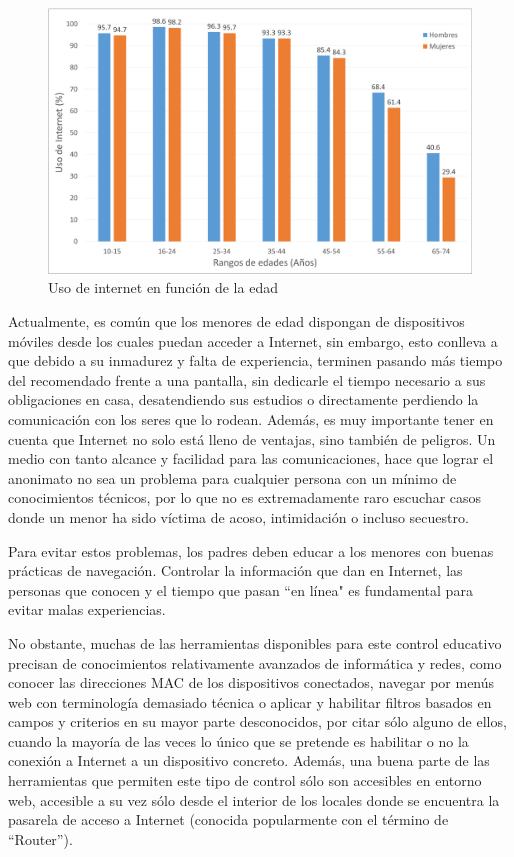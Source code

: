 \documentclass[12pt, twoside]{article}
\begin{document}
\begin{figure}[h!]
    \centering
        \includegraphics[scale=0.5]{internet_ages.eps}
        \caption{Uso de internet en función de la edad}
        \label{fig:internet_ages}
\end{figure}

Actualmente, es común que los menores de edad dispongan de dispositivos móviles desde los cuales puedan acceder a Internet, sin embargo, esto conlleva a que debido a su inmadurez y falta de experiencia, terminen pasando más tiempo del recomendado frente a una pantalla, sin dedicarle el tiempo necesario a sus obligaciones en casa, desatendiendo sus estudios o directamente perdiendo la comunicación con los seres que lo rodean. Además, es muy importante tener en cuenta que Internet no solo está lleno de ventajas, sino también de peligros. Un medio con tanto alcance y facilidad para las comunicaciones, hace que lograr el anonimato no sea un problema para cualquier persona con un mínimo de conocimientos técnicos, por lo que no es extremadamente raro escuchar casos donde un menor ha sido víctima de acoso, intimidación o incluso secuestro.

Para evitar estos problemas, los padres deben educar a los menores con buenas prácticas de navegación. Controlar la información que dan en Internet, las personas que conocen y el tiempo que pasan ``en línea" es fundamental para evitar malas experiencias.

No obstante, muchas de las herramientas disponibles para este control educativo precisan de conocimientos relativamente avanzados de informática y redes, como conocer las direcciones MAC de los dispositivos conectados, navegar por menús web con terminología demasiado técnica o aplicar y habilitar filtros basados en campos y criterios en su mayor parte desconocidos, por citar sólo alguno de ellos, cuando la mayoría de las veces lo único que se pretende es habilitar o no la conexión a Internet a un dispositivo concreto. Además, una buena parte de las herramientas que permiten este tipo de control sólo son accesibles en entorno web, accesible a su vez sólo desde el interior de los locales donde se encuentra la pasarela de acceso a Internet (conocida popularmente con el término de ``Router'').
\end{document}
